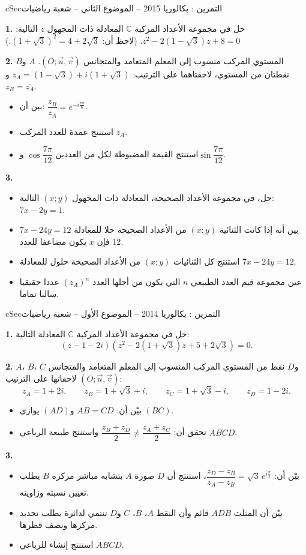 \documentclass[12pt,a4paper]{article}
\newenvironment{BOX}[2]{\begin{otherlanguage}{english}\begin{arbox}{#1}{#2}}{\end{arbox}\end{otherlanguage}}
\newcounter{exo}
\newenvironment{tamrin}[1]{\stepcounter{exo}\begin{BOX}{cSec}{التمرين \theexo: #1}}{\end{BOX}}
\newenvironment{sq}{\begin{itemize}[leftmargin=2.4em,itemsep=3pt]}{\end{itemize}}
\newcommand{\qa}{\item[(أ)]}\newcommand{\qb}{\item[(ب)]}\newcommand{\qc}{\item[(جـ)]}\newcommand{\qd}{\item[(د)]}\newcommand{\qe}{\item[(هـ)]}
\newcommand{\QQ}[1]{\par\smallskip\textbf{#1.} }
\begin{document}
\begin{tamrin}{بكالوريا 2015 -- الموضوع الثاني -- شعبة رياضيات}
\QQ{1} حل في مجموعة الأعداد المركبة $\mathbb{C}$ المعادلة ذات المجهول $z$ التالية: $z^2-2\left(1-\sqrt3\right)z+8=0$.
(لاحظ أن: $\left(1+\sqrt3\right)^2=4+2\sqrt3$.)

\QQ{2} المستوي المركب منسوب إلى المعلم المتعامد والمتجانس $\left(O;\vec u,\vec v\right)$.
$A$ و$B$ نقطتان من المستوي، لاحقتاهما على الترتيب: $z_A=\left(1-\sqrt3\right)+i\left(1+\sqrt3\right)$ و$z_B=\overline{z_A}$.
\begin{sq}
\qa بين أن: $\dfrac{z_B}{z_A}=e^{-i\frac{7\pi}{6}}$.
\qb استنتج عمدة للعدد المركب $z_A$.
\qc استنتج القيمة المضبوطة لكل من العددين $\cos\dfrac{7\pi}{12}$ و$\sin\dfrac{7\pi}{12}$.
\end{sq}
\QQ{3}
\begin{sq}
\qa حل، في مجموعة الأعداد الصحيحة، المعادلة ذات المجهول $(x;y)$ التالية: $7x-2y=1$.
\qb بين أنه إذا كانت الثنائية $(x;y)$ من الأعداد الصحيحة حلا للمعادلة $7x-24y=12$ فإن $x$ يكون مضاعفا للعدد $12$.
\qc استنتج كل الثنائيات $(x;y)$ من الأعداد الصحيحة حلول للمعادلة $7x-24y=12$.
\qd عين مجموعة قيم العدد الطبيعي $n$ التي يكون من أجلها العدد $\left(z_A\right)^n$ عددا حقيقيا سالبا تماما.
\end{sq}
\end{tamrin}
\providecommand{\MtwoAx}[4]{%
 \draw[gray!20,very thin] (#1,#3) grid (#2,#4);
 \draw[-{Stealth[length=2mm]}] (#1,0)--(#2,0) node[below left]{$x$};
 \draw[-{Stealth[length=2mm]}] (0,#3)--(0,#4) node[below left]{$y$};
 \node[below left,font=\scriptsize] at (0,0){$O$};
 \draw[-{Stealth[length=1.6mm]},thick] (0,0)--(1,0) node[below,font=\scriptsize]{$\vec u$};
 \draw[-{Stealth[length=1.6mm]},thick] (0,0)--(0,1) node[left,font=\scriptsize]{$\vec v$};}
\providecommand{\MtwoPt}[3]{\fill (#1) circle (1.6pt) node[#2,font=\small]{$#3$};}

\begin{tamrin}{بكالوريا 2014 -- الموضوع الأول -- شعبة رياضيات}
\QQ{1} حل في مجموعة الأعداد المركبة $\mathbb{C}$ المعادلة التالية:
\[(z-1-2i)\left(z^2-2\left(1+\sqrt3\right)z+5+2\sqrt3\right)=0.\]
\QQ{2} $A$، $B$، $C$ و$D$ نقط من المستوي المركب المنسوب إلى المعلم المتعامد والمتجانس $(O;\vec u,\vec v)$ لاحقاتها على الترتيب:
\[z_A=1+2i,\qquad z_B=1+\sqrt3+i,\qquad z_C=1+\sqrt3-i,\qquad z_D=1-2i.\]
\begin{sq}
\qa بيّن أن: $AB=CD$ و$(AD)$ يوازي $(BC)$.
\qb تحقق أن: $\dfrac{z_B+z_D}{2}\neq\dfrac{z_A+z_C}{2}$ واستنتج طبيعة الرباعي $ABCD$.
\end{sq}
\QQ{3}
\begin{sq}
\qa بيّن أن: $\dfrac{z_D-z_B}{z_A-z_B}=\sqrt3\,e^{i\frac{\pi}{2}}$، استنتج أن $D$ صورة $A$ بتشابه مباشر مركزه $B$ يطلب تعيين نسبته وزاويته.
\qb بيّن أن المثلث $ADB$ قائم وأن النقط $A$، $B$، $C$ و$D$ تنتمي لدائرة يطلب تحديد مركزها ونصف قطرها.
\qc استنتج إنشاء للرباعي $ABCD$.
\end{sq}
\end{tamrin}
\end{document}
